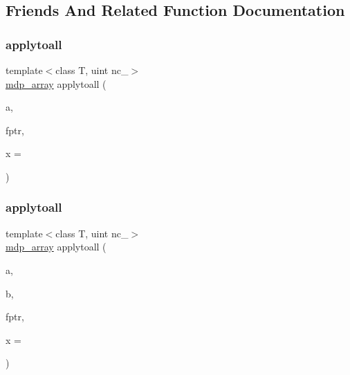 \subsection{Friends And Related Function Documentation}
\mbox{\label{classmdp__array_a720a0f3e6c74893b0bb90ddb85e2c7cf}} 
\subsubsection{\texorpdfstring{applytoall}{applytoall}\hspace{0.1cm}{\footnotesize\ttfamily [1/2]}}
{\footnotesize\ttfamily template$<$class T, uint nc\+\_\+$>$ \\
\hyperlink{classmdp__array}{mdp\+\_\+array} applytoall (\begin{DoxyParamCaption}\item[{const \hyperlink{classmdp__array}{mdp\+\_\+array}$<$ T, nc\+\_\+ $>$ \&}]{a,  }\item[{T($\ast$)(T, void $\ast$)}]{fptr,  }\item[{void $\ast$}]{x = {} }\end{DoxyParamCaption})\hspace{0.3cm}{\ttfamily [friend]}}

\mbox{\label{classmdp__array_af47ee2aa085a0ca303f6eb960be0b257}} 
\subsubsection{\texorpdfstring{applytoall}{applytoall}\hspace{0.1cm}{\footnotesize\ttfamily [2/2]}}
{\footnotesize\ttfamily template$<$class T, uint nc\+\_\+$>$ \\
\hyperlink{classmdp__array}{mdp\+\_\+array} applytoall (\begin{DoxyParamCaption}\item[{const \hyperlink{classmdp__array}{mdp\+\_\+array}$<$ T, nc\+\_\+ $>$ \&}]{a,  }\item[{const \hyperlink{classmdp__array}{mdp\+\_\+array}$<$ T, nc\+\_\+ $>$ \&}]{b,  }\item[{T($\ast$)(T, T, void $\ast$)}]{fptr,  }\item[{void $\ast$}]{x = {} }\end{DoxyParamCaption})\hspace{0.3cm}{\ttfamily [friend]}}

